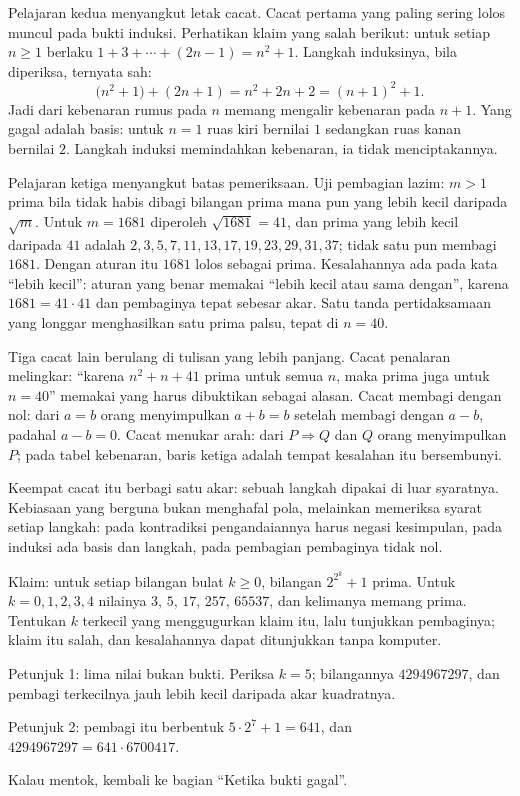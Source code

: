 Pelajaran kedua menyangkut letak cacat. Cacat pertama yang paling sering lolos muncul
pada bukti induksi. Perhatikan klaim yang salah berikut: untuk setiap $n \geq 1$
berlaku $1+3+\cdots+(2n-1) = n^{2}+1$. Langkah induksinya, bila diperiksa, ternyata
sah:
\[
  \bigl(n^{2}+1\bigr) + (2n+1) = n^{2} + 2n + 2 = (n+1)^{2} + 1 .
\]
Jadi dari kebenaran rumus pada $n$ memang mengalir kebenaran pada $n+1$. Yang gagal
adalah basis: untuk $n = 1$ ruas kiri bernilai $1$ sedangkan ruas kanan bernilai $2$.
Langkah induksi memindahkan kebenaran, ia tidak menciptakannya.

Pelajaran ketiga menyangkut batas pemeriksaan. Uji pembagian lazim: $m > 1$ prima bila
tidak habis dibagi bilangan prima mana pun yang lebih kecil daripada $\sqrt{m}$. Untuk $m = 1681$ diperoleh $\sqrt{1681} = 41$, dan prima yang
lebih kecil daripada $41$ adalah $2, 3, 5, 7, 11, 13, 17, 19, 23, 29, 31, 37$; tidak
satu pun membagi $1681$. Dengan aturan itu $1681$ lolos sebagai prima. Kesalahannya ada
pada kata ``lebih kecil'': aturan yang benar memakai ``lebih kecil atau sama dengan'',
karena $1681 = 41 \cdot 41$ dan pembaginya tepat sebesar akar. Satu tanda pertidaksamaan
yang longgar menghasilkan satu prima palsu, tepat di $n = 40$.

Tiga cacat lain berulang di tulisan yang lebih panjang. Cacat penalaran melingkar:
``karena $n^{2}+n+41$ prima untuk semua $n$, maka prima juga untuk $n = 40$'' memakai
yang harus dibuktikan sebagai alasan. Cacat membagi dengan nol: dari $a = b$ orang
menyimpulkan $a+b = b$ setelah membagi dengan $a-b$, padahal $a-b = 0$. Cacat menukar
arah: dari $P \Rightarrow Q$ dan $Q$ orang menyimpulkan $P$; pada tabel kebenaran,
baris ketiga adalah tempat kesalahan itu bersembunyi.

Keempat cacat itu berbagi satu akar: sebuah langkah dipakai di luar syaratnya.
Kebiasaan yang berguna bukan menghafal pola, melainkan memeriksa syarat setiap langkah:
pada kontradiksi pengandaiannya harus negasi kesimpulan, pada induksi ada basis dan
langkah, pada pembagian pembaginya tidak nol.

\begin{tantangan}
Klaim: untuk setiap bilangan bulat $k \geq 0$, bilangan $2^{2^{k}}+1$ prima. Untuk
$k = 0,1,2,3,4$ nilainya $3$, $5$, $17$, $257$, $65537$, dan kelimanya memang prima.
Tentukan $k$ terkecil yang menggugurkan klaim itu, lalu tunjukkan pembaginya; klaim itu
salah, dan kesalahannya dapat ditunjukkan tanpa komputer.

Petunjuk 1: lima nilai bukan bukti. Periksa $k = 5$; bilangannya $4294967297$, dan pembagi
terkecilnya jauh lebih kecil daripada akar kuadratnya.

Petunjuk 2: pembagi itu berbentuk $5 \cdot 2^{7}+1 = 641$, dan
$4294967297 = 641 \cdot 6700417$.

Kalau mentok, kembali ke bagian ``Ketika bukti gagal''.
\end{tantangan}

